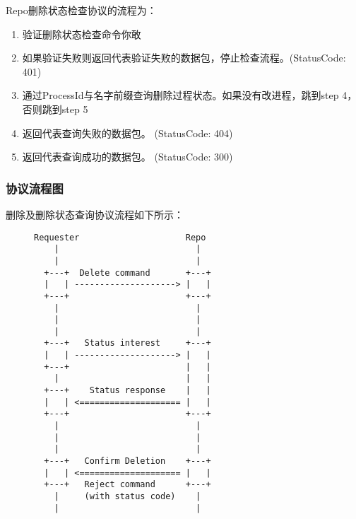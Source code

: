 Repo删除状态检查协议的流程为：
\begin{enumerate}[step 1.]
\item 验证删除状态检查命令你敢
\item 如果验证失败则返回代表验证失败的数据包，停止检查流程。(StatusCode: 401)
\item 通过ProcessId与名字前缀查询删除过程状态。如果没有改进程，跳到step 4，否则跳到step 5
\item 返回代表查询失败的数据包。 (StatusCode: 404)
\item 返回代表查询成功的数据包。 (StatusCode: 300)
\end{enumerate}

\subsubsection{协议流程图}
删除及删除状态查询协议流程如下所示：

\begin{figure}[H]
\begin{framed}
\begin{scriptsize}
\begin{verbatim}
Requester                     Repo 
    |                           |                                 
    |                           |                                 
  +---+  Delete command       +---+                               
  |   | --------------------> |   |                               
  +---+                       +---+                               
    |                           |                                 
    |                           |                                 
    |                           |                                 
  +---+   Status interest     +---+                               
  |   | --------------------> |   |                               
  +---+                       |   |                               
    |                         |   |                               
  +---+    Status response    |   |                               
  |   | <==================== |   |                               
  +---+                       +---+                               
    |                           |                                 
    |                           |                                 
    |                           |                                 
  +---+   Confirm Deletion    +---+                               
  |   | <==================== |   |                               
  +---+   Reject command      +---+                               
    |     (with status code)    |    
    |                           |
\end{verbatim}
\end{scriptsize}
\end{framed}
\end{figure}

